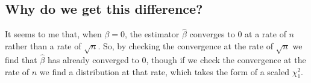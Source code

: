 \documentclass[11pt]{article} %
\begin{document}
\subsection{Why do we get this difference?}
It seems to me that, when $\beta=0$, the estimator $\hat{\beta}$ converges to $0$ at a rate of $n$ rather than a rate of $\sqrt{n}$. So, by checking the convergence at the rate of $\sqrt{n}$ we find that $\hat{\beta}$ has already converged to $0$, though if we check the convergence at the rate of $n$ we find a distribution at that rate, which takes the form of a scaled $\chi^2_1$.
\end{document}
